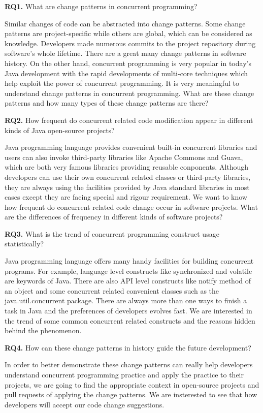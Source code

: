\documentclass[conference]{IEEEtran}
\begin{document}
\textbf{RQ1.} What are change patterns in concurrent programming?

Similar changes of code can be abstracted into change patterns. Some change patterns are project-specific while others are global, which can be considered as knowledge. Developers made numerous commits to the project repository during software's whole lifetime. There are a great many change patterns in software history. On the other hand, concurrent programming is very popular in today's Java development with the rapid developments of multi-core techniques which help exploit the power of concurrent programming. It is very meaningful to understand change patterns in concurrent programming. What are these change patterns and how many types of these change patterns are there?

\textbf{RQ2.} How frequent do concurrent related code modification appear in different kinds of Java open-source projects?

Java programming language provides convenient built-in concurrent libraries and users can also invoke third-party libraries like Apache Commons and Guava, which are both very famous libraries providing reusable conponents. Although developers can use their own concurrent related classes or third-party libraries, they are always using the facilities provided by Java standard libraries in most cases except they are facing special and rigour requirement. We want to know how frequent do concurrent related code change occur in software projects. What are the differences of frequency in different kinds of software projects?

\textbf{RQ3.} What is the trend of concurrent programming construct usage statistically?

Java programming language offers many handy facilities for building concurrent programs. For example, language level constructs like synchronized and volatile are keywords of Java.  There are also API level constructs like notify method of an object and some concurrent related convenient classes such as the java.util.concurrent package. There are always more than one ways to finish a task in Java and the preferences of developers evolves fast. We are interested in  the trend of some common concurrent related constructs and the reasons hidden behind the phenomenon.

\textbf{RQ4.} How can these change patterns in history guide the future development?

In order to better demonstrate these change patterns can really help developers understand concurrent programming practice and apply the practice to their projects, we are going to find the appropriate context in open-source projects and pull requests of  applying the change patterns. We are insterested to see that how developers will accept our code change suggestions.
\end{document}
